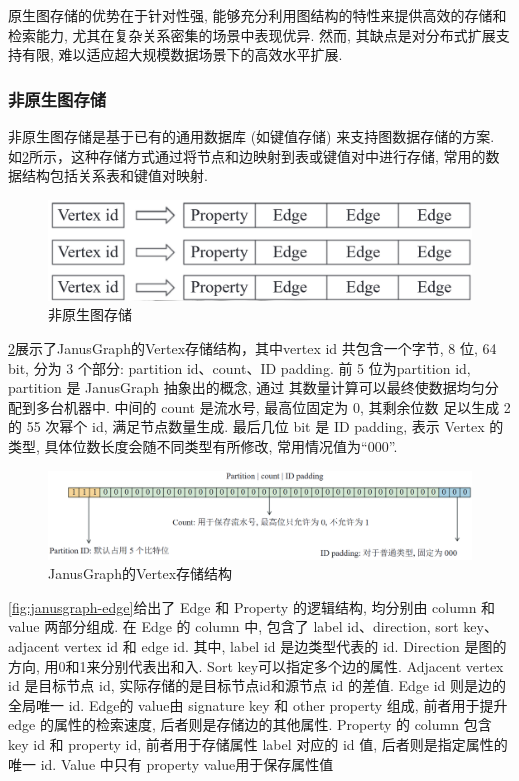 原生图存储的优势在于针对性强, 能够充分利用图结构的特性来提供高效的存储和检索能力, 尤其在复杂关系密集的场景中表现优异. 然而, 其缺点是对分布式扩展支持有限, 难以适应超大规模数据场景下的高效水平扩展.



\vspace{1cm}
\subsubsection*{非原生图存储}

非原生图存储是基于已有的通用数据库 (如键值存储) 来支持图数据存储的方案. 如\cref{fig:janusgraph-vertex}所示，这种存储方式通过将节点和边映射到表或键值对中进行存储, 常用的数据结构包括关系表和键值对映射.
\begin{figure}[H]
	\centering
	\includegraphics[width=\textwidth]{images/6.png}
	\caption{非原生图存储}
	\label{fig:non-native}
\end{figure}
\cref{fig:janusgraph-vertex}展示了JanusGraph的Vertex存储结构，其中vertex id 共包含一个字节, 8 位, 64 bit, 分为  3 个部分: partition id、count、ID padding. 前 5 位为partition id, partition 是 JanusGraph 抽象出的概念, 通过  其数量计算可以最终使数据均匀分配到多台机器中.  中间的 count 是流水号, 最高位固定为 0, 其剩余位数  足以生成 2 的 55 次幂个 id, 满足节点数量生成. 最后几位 bit 是 ID padding, 表示 Vertex 的类型, 具体位数长度会随不同类型有所修改, 常用情况值为“000”.
\begin{figure}[H]
	\includegraphics[width=1\textwidth]{images/12.png}
	\caption{JanusGraph的Vertex存储结构}
	\label{fig:janusgraph-vertex}
\end{figure}
\cref{fig:janusgraph-edge}给出了 Edge 和 Property 的逻辑结构, 均分别由 column 和 value 两部分组成. 在 Edge 的 column 中, 包含了 label id、direction, sort key、adjacent vertex id 和 edge id. 其中, label id 是边类型代表的 id. Direction 是图的方向, 用0和1来分别代表出和入. Sort key可以指定多个边的属性. Adjacent vertex id 是目标节点 id, 实际存储的是目标节点id和源节点 id 的差值. Edge id 则是边的全局唯一 id. Edge的 value由 signature key 和 other property 组成, 前者用于提升 edge 的属性的检索速度, 后者则是存储边的其他属性.  Property 的 column 包含 key id 和 property id, 前者用于存储属性 label 对应的 id 值, 后者则是指定属性的唯一 id. Value 中只有 property value用于保存属性值
